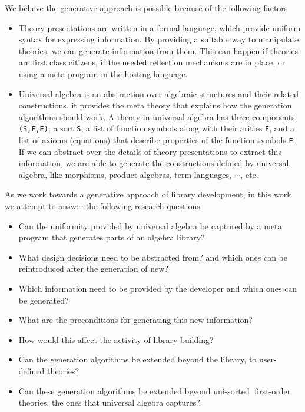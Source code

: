 We believe the generative approach is possible because of the following factors 
\begin{itemize}
    \item Theory presentations are written in a formal language, which provide uniform syntax for expressing information. By providing a suitable way to manipulate theories, we can generate information from them. This can happen if theories are first class citizens, if the needed reflection mechanisms are in place, or using a meta program in the hosting language. 
    \item Universal algebra is an abstraction over algebraic structures and their related constructions. it provides the meta theory that explains how the generation algorithms should work. A theory in universal algebra has three components \verb|(S,F,E)|; a sort \verb|S|, a list of function symbols along with their arities \verb|F|, and a list of axioms (equations) that describe properties of the function symbols \verb|E|. If we can abstract over the details of theory presentations to extract this information, we are able to generate the constructions defined by universal algebra, like morphisms, product algebras, term languages, $\cdots$, etc. 
\end{itemize}

As we work towards a generative approach of library development, in this work we attempt to answer the following research questions 
\begin{itemize}
    \item Can the uniformity provided by universal algebra be captured by a meta program that generates parts of an algebra library?
    \item What design decisions need to be abstracted from? and which ones can be reintroduced after the generation of new?
    \item Which information need to be provided by the developer and which ones can be generated? 
    \item What are the preconditions for generating this new information? 
    \item How would this affect the activity of library building?
    \item Can the generation algorithms be extended beyond the library, to user-defined theories?
    \item Can these generation algorithms be extended beyond uni-sorted first-order theories, the ones that universal algebra captures? 
\end{itemize}


